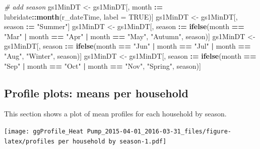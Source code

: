 \documentclass[]{article}
\newenvironment{Shaded}{\begin{snugshade}}{\end{snugshade}}
\newcommand{\KeywordTok}[1]{\textcolor[rgb]{0.13,0.29,0.53}{\textbf{#1}}}
\newcommand{\DataTypeTok}[1]{\textcolor[rgb]{0.13,0.29,0.53}{#1}}
\newcommand{\StringTok}[1]{\textcolor[rgb]{0.31,0.60,0.02}{#1}}
\newcommand{\CommentTok}[1]{\textcolor[rgb]{0.56,0.35,0.01}{\textit{#1}}}
\newcommand{\OtherTok}[1]{\textcolor[rgb]{0.56,0.35,0.01}{#1}}
\newcommand{\OperatorTok}[1]{\textcolor[rgb]{0.81,0.36,0.00}{\textbf{#1}}}
\newcommand{\ErrorTok}[1]{\textcolor[rgb]{0.64,0.00,0.00}{\textbf{#1}}}
\newcommand{\NormalTok}[1]{#1}
\begin{document}
\begin{Shaded}
\begin{Highlighting}[]
\CommentTok{# add season}
\NormalTok{gs1MinDT <-}\StringTok{ }\NormalTok{gs1MinDT[, month }\OperatorTok{:}\ErrorTok{=}\StringTok{ }\NormalTok{lubridate}\OperatorTok{::}\KeywordTok{month}\NormalTok{(r_dateTime, }\DataTypeTok{label =} \OtherTok{TRUE}\NormalTok{)]}
\NormalTok{gs1MinDT <-}\StringTok{ }\NormalTok{gs1MinDT[, season }\OperatorTok{:}\ErrorTok{=}\StringTok{ "Summer"}\NormalTok{]}
\NormalTok{gs1MinDT <-}\StringTok{ }\NormalTok{gs1MinDT[, season }\OperatorTok{:}\ErrorTok{=}\StringTok{ }\KeywordTok{ifelse}\NormalTok{(month }\OperatorTok{==}\StringTok{ "Mar"} \OperatorTok{|}
\StringTok{                                              }\NormalTok{month }\OperatorTok{==}\StringTok{ "Apr"} \OperatorTok{|}
\StringTok{                                              }\NormalTok{month }\OperatorTok{==}\StringTok{ "May"}\NormalTok{, }\StringTok{"Autumn"}\NormalTok{, season)]}
\NormalTok{gs1MinDT <-}\StringTok{ }\NormalTok{gs1MinDT[, season }\OperatorTok{:}\ErrorTok{=}\StringTok{ }\KeywordTok{ifelse}\NormalTok{(month }\OperatorTok{==}\StringTok{ "Jun"} \OperatorTok{|}
\StringTok{                                              }\NormalTok{month }\OperatorTok{==}\StringTok{ "Jul"} \OperatorTok{|}
\StringTok{                                              }\NormalTok{month }\OperatorTok{==}\StringTok{ "Aug"}\NormalTok{, }\StringTok{"Winter"}\NormalTok{, season)]}
\NormalTok{gs1MinDT <-}\StringTok{ }\NormalTok{gs1MinDT[, season }\OperatorTok{:}\ErrorTok{=}\StringTok{ }\KeywordTok{ifelse}\NormalTok{(month }\OperatorTok{==}\StringTok{ "Sep"} \OperatorTok{|}
\StringTok{                                              }\NormalTok{month }\OperatorTok{==}\StringTok{ "Oct"} \OperatorTok{|}
\StringTok{                                              }\NormalTok{month }\OperatorTok{==}\StringTok{ "Nov"}\NormalTok{, }\StringTok{"Spring"}\NormalTok{, season)]}
\end{Highlighting}
\end{Shaded}

\subsection{Profile plots: means per
household}\label{profile-plots-means-per-household}

This section shows a plot of mean profiles for each household by season.

\texttt{[image: ggProfile\_Heat Pump\_2015-04-01\_2016-03-31\_files/figure-latex/profiles per household by season-1.pdf]}
\end{document}
